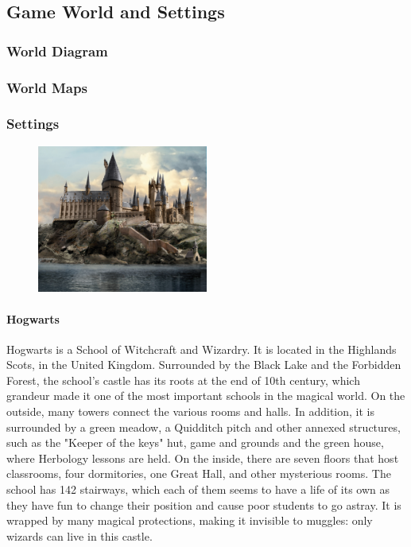 \subsection*{Game World and Settings}

\subsubsection*{World Diagram}


\subsubsection*{World Maps}


\subsubsection*{Settings}






\begin{figure}
\centering
\includegraphics[max width=0.5\textwidth]{../Pictures/Locations/Hogwarts/Castle_picture.png}
\end{figure}
\paragraph{Hogwarts}
Hogwarts is a School of Witchcraft and Wizardry. It is located in the Highlands Scots, in the United Kingdom. Surrounded by the Black Lake and the Forbidden Forest, the school's castle has its roots at the end of 10th century, which grandeur made it one of the most important schools in the magical world. On the outside, many towers connect the various rooms and halls. In addition, it is surrounded by a green meadow, a Quidditch pitch and other annexed structures, such as the "Keeper of the keys" hut, game and grounds and the green house, where Herbology lessons are held. On the inside, there are seven floors that host classrooms, four dormitories, one Great Hall, and other mysterious rooms. The school has 142 stairways, which each of them seems to have a life of its own as they have fun to change their position and cause poor students to go astray. It is wrapped by many magical protections, making it invisible to muggles: only wizards can live in this castle. 

